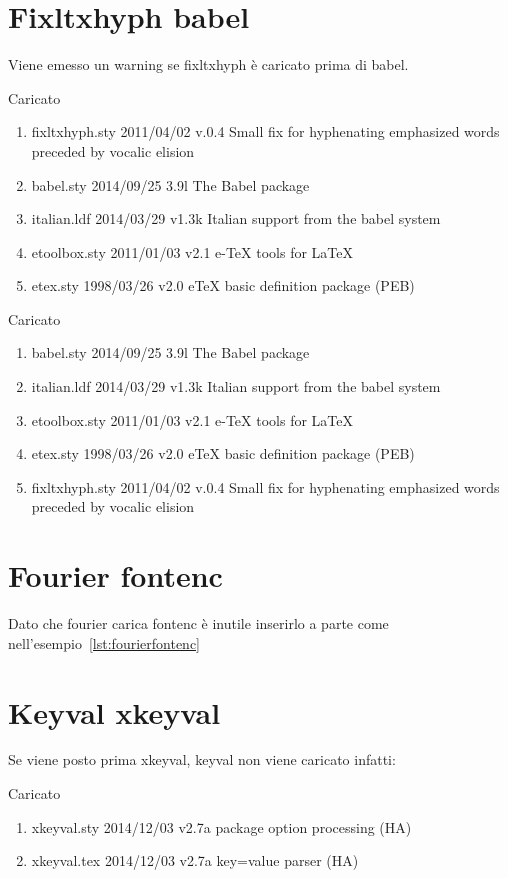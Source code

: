 \section{Fixltxhyph babel}
Viene emesso un warning se fixltxhyph è caricato prima di babel. 

Caricato 
\begin{enumerate}
\item fixltxhyph.sty 2011/04/02 v.0.4 Small fix for hyphenating emphasized words preceded by vocalic elision
\item babel.sty 2014/09/25 3.9l The Babel package
\item italian.ldf 2014/03/29 v1.3k Italian support from the babel system
\item etoolbox.sty 2011/01/03 v2.1 e-TeX tools for LaTeX
\item etex.sty 1998/03/26 v2.0 eTeX basic definition package (PEB)
\end{enumerate}

Caricato 
\begin{enumerate}
\item babel.sty 2014/09/25 3.9l The Babel package
\item italian.ldf 2014/03/29 v1.3k Italian support from the babel system
\item etoolbox.sty 2011/01/03 v2.1 e-TeX tools for LaTeX
\item etex.sty 1998/03/26 v2.0 eTeX basic definition package (PEB)
\item fixltxhyph.sty 2011/04/02 v.0.4 Small fix for hyphenating emphasized words preceded by vocalic elision
\end{enumerate}
\section{Fourier fontenc}
Dato che fourier carica fontenc è inutile inserirlo a parte come nell'esempio~\vref{lst:fourierfontenc}

\section{Keyval xkeyval}
Se viene posto prima xkeyval, keyval non viene caricato infatti: 

Caricato 
\begin{enumerate}
\item xkeyval.sty  2014/12/03 v2.7a package option processing (HA)
\item xkeyval.tex 2014/12/03 v2.7a key=value parser (HA)
\end{enumerate}
